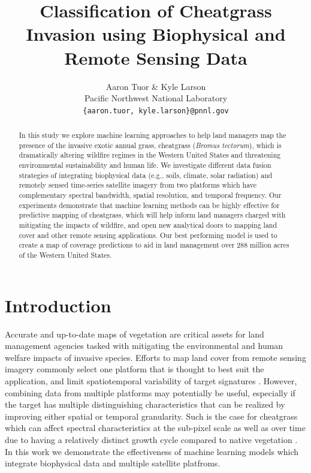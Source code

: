 \documentclass{article} %
\title{Classification of Cheatgrass Invasion using Biophysical and Remote Sensing Data}
\author{Aaron Tuor  \& Kyle Larson \\
Pacific Northwest National Laboratory\\
\texttt{\{aaron.tuor, kyle.larson\}@pnnl.gov}}
\begin{document}
    \maketitle

\begin{abstract} 
In this study we explore machine learning approaches to help land managers map the presence of the invasive exotic annual grass, cheatgrass ({\em Bromus tectorum}), which is dramatically altering wildfire regimes in the Western United States and threatening environmental sustainability and human life. 
We investigate different data fusion strategies of integrating biophysical data (e.g., soils, climate, solar radiation) and remotely sensed time-series satellite imagery from two platforms which have complementary spectral bandwidth, spatial resolution,
and temporal frequency. Our experiments demonstrate that machine learning
methods can be highly effective for predictive mapping of cheatgrass, which will help inform land managers charged with mitigating the impacts of wildfire, and open new analytical doors to mapping land cover and other remote sensing applications. Our best performing
model is used to create a map of coverage predictions to aid in land management
over 288 million acres of the Western United States.
 \end{abstract}

 \section{Introduction}
Accurate and up-to-date maps of vegetation are critical assets for land management agencies
tasked with mitigating the environmental and human welfare impacts of invasive species. Efforts to map
land cover from remote sensing imagery commonly select one platform that is thought to best suit the application, and limit spatiotemporal variability of target signatures \citep{rogan2008mapping}. 
However, combining data from multiple platforms may potentially be useful, especially if the target has multiple distinguishing characteristics that can be realized by improving either spatial or temporal granularity. Such is the case for cheatgrass which can affect spectral characteristics at the sub-pixel scale as well as over time due to having a relatively distinct growth cycle
compared to native vegetation \citep{west2017using}. In this work we demonstrate the effectiveness of
machine learning models which integrate biophysical data and multiple satellite platfroms.
\end{document}
